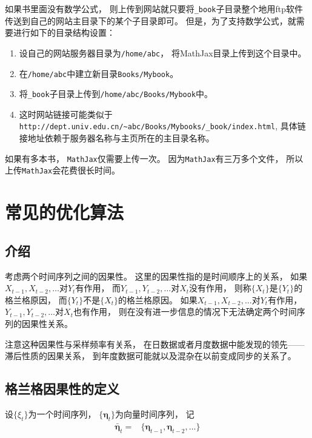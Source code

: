 \documentclass[]{book}
\providecommand{\tightlist}{%
  \setlength{\itemsep}{0pt}\setlength{\parskip}{0pt}}
\theoremstyle{definition}
\theoremstyle{definition}
\theoremstyle{definition}
\theoremstyle{remark}
\begin{document}
如果书里面没有数学公式，
则上传到网站就只要将\texttt{\_book}子目录整个地用ftp软件传送到自己的网站主目录下的某个子目录即可。
但是，为了支持数学公式，就需要进行如下的目录结构设置：

\begin{enumerate}
\def\labelenumi{\arabic{enumi}.}
\tightlist
\item
  设自己的网站服务器目录为\texttt{/home/abc}，
  将MathJax目录上传到这个目录中。
\item
  在\texttt{/home/abc}中建立新目录\texttt{Books/Mybook}。
\item
  将\texttt{\_book}子目录上传到\texttt{/home/abc/Books/Mybook}中。
\item
  这时网站链接可能类似于\texttt{http://dept.univ.edu.cn/\textasciitilde{}abc/Books/Mybooks/\_book/index.html},
  具体链接地址依赖于服务器名称与主页所在的主目录名称。
\end{enumerate}

如果有多本书， \texttt{MathJax}仅需要上传一次。
因为\texttt{MathJax}有三万多个文件，
所以上传\texttt{MathJax}会花费很长时间。

\hypertarget{causal}{%
\chapter{常见的优化算法}\label{causal}}

\hypertarget{causal-intro}{%
\section{介绍}\label{causal-intro}}

考虑两个时间序列之间的因果性。 这里的因果性指的是时间顺序上的关系，
如果\(X_{t-1}, X_{t-2}, \dots\)对\(Y_t\)有作用，
而\(Y_{t-1}, Y_{t-2}, \dots\)对\(X_t\)没有作用，
则称\(\{X_t \}\)是\(\{ Y_t \}\)的格兰格原因，
而\(\{ Y_t \}\)不是\(\{ X_t \}\)的格兰格原因。
如果\(X_{t-1}, X_{t-2}, \dots\)对\(Y_t\)有作用，
\(Y_{t-1}, Y_{t-2}, \dots\)对\(X_t\)也有作用，
则在没有进一步信息的情况下无法确定两个时间序列的因果性关系。

注意这种因果性与采样频率有关系，
在日数据或者月度数据中能发现的领先------滞后性质的因果关系，
到年度数据可能就以及混杂在以前变成同步的关系了。

\hypertarget{causal-def}{%
\section{格兰格因果性的定义}\label{causal-def}}

设\(\{ \xi_t \}\)为一个时间序列，
\(\{ \boldsymbol{\eta}_t \}\)为向量时间序列， 记 \[\begin{aligned}
\bar{\boldsymbol{\eta}}_t =& \{ \boldsymbol{\eta}_{t-1}, \boldsymbol{\eta}_{t-2}, \dots \} 
\end{aligned}\]
\end{document}
